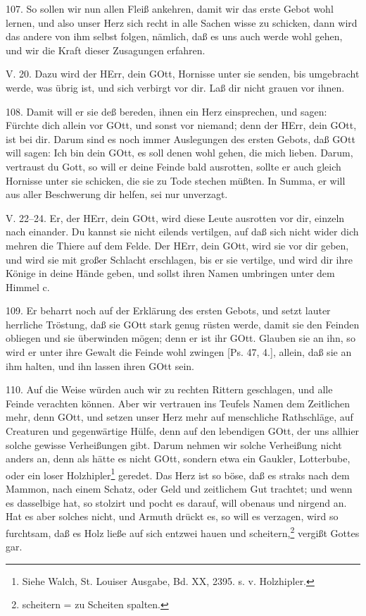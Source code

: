 107. So sollen wir nun allen Fleiß ankehren, damit wir das erste Gebot wohl lernen, und also unser Herz sich recht in alle Sachen wisse zu schicken, dann wird das andere von ihm selbst folgen, nämlich, daß es uns auch werde wohl gehen, und wir die Kraft dieser Zusagungen erfahren.

\begin{schriftzitat}
V. 20. Dazu wird der HErr, dein GOtt, Hornisse unter sie senden, bis umgebracht werde, was übrig ist, und sich verbirgt vor dir. Laß dir nicht grauen vor ihnen.
\end{schriftzitat}

108. Damit will er sie deß bereden, ihnen ein Herz einsprechen, und sagen: Fürchte dich allein vor GOtt, und sonst vor niemand; denn der HErr, dein GOtt, ist bei dir. Darum sind es noch immer Auslegungen des ersten Gebots, daß GOtt will sagen: Ich bin dein GOtt, es soll denen wohl gehen, die mich lieben. Darum, vertraust du Gott, so will er deine Feinde bald ausrotten, sollte er auch gleich Hornisse unter sie schicken, die sie zu Tode stechen müßten. In Summa, er will aus aller Beschwerung dir helfen, sei nur unverzagt.

\begin{schriftzitat}
V. 22–24. Er, der HErr, dein GOtt, wird diese Leute ausrotten vor dir, einzeln nach einander. Du kannst sie nicht eilends vertilgen, auf daß sich nicht wider dich mehren die Thiere auf dem Felde. Der HErr, dein GOtt, wird sie vor dir geben, und wird sie mit großer Schlacht erschlagen, bis er sie vertilge, und wird dir ihre Könige in deine Hände geben, und sollst ihren Namen umbringen unter dem Himmel c.
\end{schriftzitat}

109. Er beharrt noch auf der Erklärung des ersten Gebots, und setzt lauter herrliche Tröstung, daß sie GOtt stark genug rüsten werde, damit sie den Feinden obliegen und sie überwinden mögen; denn er ist ihr GOtt. Glauben sie an ihn, so wird er unter ihre Gewalt die Feinde wohl zwingen [Ps. 47, 4.], allein, daß sie an ihm halten, und ihn lassen ihren GOtt sein.

110. Auf die Weise würden auch wir zu rechten Rittern geschlagen, und alle Feinde verachten können. Aber wir vertrauen ins Teufels Namen dem Zeitlichen mehr, denn GOtt, und setzen unser Herz mehr auf menschliche Rathschläge, auf Creaturen und gegenwärtige Hülfe, denn auf den lebendigen GOtt, der uns allhier solche gewisse Verheißungen gibt. Darum nehmen wir solche Verheißung nicht anders an, denn als hätte es nicht GOtt, sondern etwa ein Gaukler, Lotterbube, oder ein loser Holzhipler\footnote{Siehe Walch, St. Louiser Ausgabe, Bd. XX, 2395. s. v. Holzhipler.} geredet. Das Herz ist so böse, daß es straks nach dem Mammon, nach einem Schatz, oder Geld und zeitlichem Gut trachtet; und wenn es dasselbige hat, so stolzirt und pocht es darauf, will obenaus und nirgend an. Hat es aber solches nicht, und Armuth drückt es, so will es verzagen, wird so furchtsam, daß es Holz ließe auf sich entzwei hauen und scheitern,\footnote{scheitern = zu Scheiten spalten.} vergißt Gottes gar.

